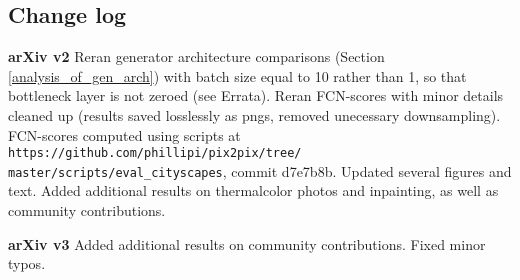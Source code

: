 \documentclass[10pt,twocolumn,letterpaper]{article}
\begin{document}
\subsection{Change log}
{\bf arXiv v2} Reran generator architecture comparisons (Section \ref{analysis_of_gen_arch}) with batch size equal to 10 rather than 1, so that bottleneck layer is not zeroed (see Errata). Reran FCN-scores with minor details cleaned up (results saved losslessly as pngs, removed unecessary downsampling). FCN-scores computed using scripts at \texttt{https://github.com/phillipi/pix2pix/tree/\\master/scripts/eval\_cityscapes}, commit d7e7b8b. Updated several figures and text. Added additional results on thermalcolor photos and inpainting, as well as community contributions.

{\bf arXiv v3} Added additional results on community contributions. Fixed minor typos.
\end{document}
